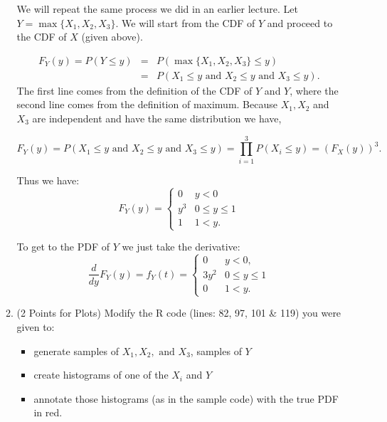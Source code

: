 \documentclass[10pt,letterpaper]{exam}
\begin{document}
\begin{large}
\begin{enumerate}
\begin{enumerate}
\begin{solution}
We will repeat the same process we did in an earlier lecture. Let $Y =  \max \{ X_1, X_2, X_3 \}$. We will start from the CDF of $Y$ and proceed to the CDF of $X$ (given above).

\begin{eqnarray}
F_Y(y) = P(Y \leq y ) & = & P\left( \max \{ X_1, X_2, X_3 \} \leq y\right) \nonumber \\
& = & P( X_1 \leq y \text{ and } X_2 \leq y \text{ and } X_3 \leq y) \nonumber.
\end{eqnarray} 
The first line comes from the definition of the CDF of $Y$ and $Y$, where the second line comes from the definition of maximum. Because $X_1, X_2$ and $X_3$ are independent and have the same distribution we have,

$$F_Y(y)=P( X_1 \leq y \text{ and } X_2 \leq y \text{ and } X_3 \leq y)=  \prod_{i = 1}^{3} P(X_i \leq y)
 = \left( F_X(y) \right)^3.$$

Thus we have:
\begin{equation}
F_Y(y) = \begin{cases}
0 & y < 0 \\
y^3 & 0 \leq y \leq 1 \\
1 & 1 < y.
\end{cases}
\end{equation}

To get to the PDF of $Y$ we just take the derivative:
$$
\frac{d}{dy} F_Y(y) = f_Y(t) = \begin{cases}
0 & y < 0,\\
3 y^2& 0 \leq y \leq 1 \\
0 & 1 < y.
\end{cases}
$$

\end{solution}

\item (2 Points for Plots) Modify the R code (lines: 82, 97, 101 \& 119) you were given to:
\begin{itemize}
\item  generate samples of $X_1,X_2, \text{ and } X_3$, samples of $Y$ 
\item create histograms of one of the $X_i$ and $Y$
\item annotate those histograms (as in the sample code) with the true PDF in red.
\end{itemize}
\end{enumerate}


\end{enumerate}




\end{large}
\end{document}
